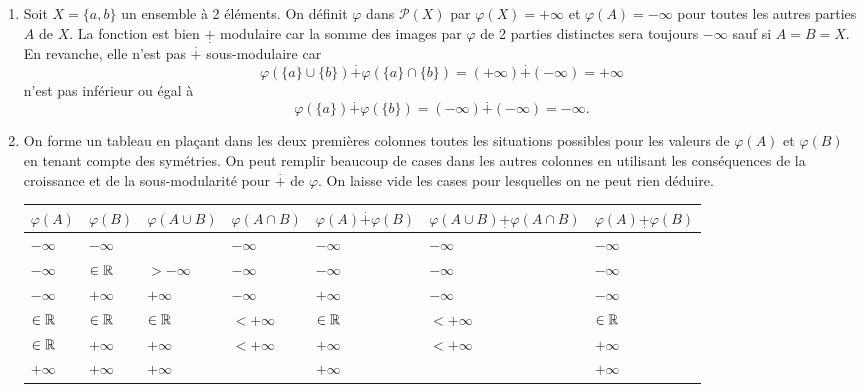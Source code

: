   \begin{demo}
  \begin{enumerate}
    \item Soit $X=\{a,b\}$ un ensemble à 2 éléments. On définit $\varphi$ dans $\mathcal{P}(X)$ par $\varphi(X) = +\infty$ et $\varphi(A) = - \infty$ pour toutes les autres parties $A$ de $X$. La fonction est bien $\underset{.}{+}$ modulaire car la somme des images par $\varphi$ de 2 parties distinctes sera toujours $-\infty$ sauf si $A=B=X$. En revanche, elle n'est pas $\overset{.}{+}$ sous-modulaire car 
    \begin{displaymath}
      \varphi(\{a\}\cup \{b\}) \overset{.}{+} \varphi(\{a\}\cap \{b\}) = (+\infty) \overset{.}{+} (-\infty) = + \infty 
    \end{displaymath}
    n'est pas inférieur ou égal à
    \begin{displaymath}
      \varphi(\{a\}) \overset{.}{+} \varphi(\{b\}) = (-\infty) \overset{.}{+} (-\infty) = - \infty. 
    \end{displaymath}

    \item On forme un tableau en plaçant dans les deux premières colonnes toutes les situations possibles pour les valeurs de $\varphi(A)$ et $\varphi(B)$ en tenant compte des symétries. On peut remplir beaucoup de cases dans  les autres colonnes en utilisant les conséquences de la croissance et de la sous-modularité pour $\overset{.}{+}$ de $\varphi$. On laisse vide les cases pour lesquelles on ne peut rien déduire.
\begin{center}
\begin{tabular}{lllllll}
$\varphi(A)$ & $\varphi(B)$ & $\varphi(A\cup B)$ & $\varphi(A\cap B)$ & $\varphi(A) \overset{.}{+} \varphi(B)$ & $\varphi(A\cup B) \underset{.}{+} \varphi(A\cap B)$ & $\varphi(A) \underset{.}{+} \varphi(B)$\\ \hline
$-\infty$    & $-\infty$    &                    & $-\infty$          & $-\infty$                              & $-\infty$   & $-\infty$ \\  \hline
$-\infty$    & $\in \mathbb{R}$     & $> -\infty$        & $-\infty$          & $-\infty$                              & $-\infty$   & $-\infty$ \\ \hline
$-\infty$    & $+\infty$    & $+\infty$          & $-\infty$          & $+\infty$                              & $-\infty$   & $-\infty$\\ \hline
$\in \mathbb{R}$     & $\in \mathbb{R}$     & $\in \mathbb{R}$           & $< +\infty$        & $\in \mathbb{R}$                               & $< +\infty$ & $\in \mathbb{R}$\\ \hline
$\in \mathbb{R}$     & $+\infty$    & $+\infty$          & $< +\infty$        & $+\infty$                              & $< +\infty$ & $+\infty$ \\ \hline
$+\infty$    & $+\infty$    & $+\infty$          &                    & $+\infty$                              &             & $+\infty$\\ \hline
\end{tabular}
\end{center}
  \end{enumerate}
  \end{demo}
